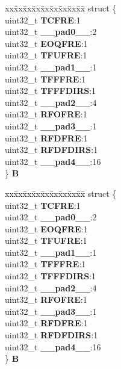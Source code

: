 \begin{DoxyCompactItemize}
\begin{tabbing}
\end{tabbing}\item 
\mbox{\label{unionDSPI__tag_1_1DSPI__RSER__tag_a68bef44c9cbcb72ae3aa250eafebe0d1}} 
\begin{tabbing}
xx\=xx\=xx\=xx\=xx\=xx\=xx\=xx\=xx\=\kill
struct \{\\
\>uint32\_t {\bfseries TCFRE}:1\\
\>uint32\_t {\bfseries \_\_pad0\_\_}:2\\
\>uint32\_t {\bfseries EOQFRE}:1\\
\>uint32\_t {\bfseries TFUFRE}:1\\
\>uint32\_t {\bfseries \_\_pad1\_\_}:1\\
\>uint32\_t {\bfseries TFFFRE}:1\\
\>uint32\_t {\bfseries TFFFDIRS}:1\\
\>uint32\_t {\bfseries \_\_pad2\_\_}:4\\
\>uint32\_t {\bfseries RFOFRE}:1\\
\>uint32\_t {\bfseries \_\_pad3\_\_}:1\\
\>uint32\_t {\bfseries RFDFRE}:1\\
\>uint32\_t {\bfseries RFDFDIRS}:1\\
\>uint32\_t {\bfseries \_\_pad4\_\_}:16\\
\} {\bfseries B}\\

\end{tabbing}\item 
\mbox{\label{unionDSPI__tag_1_1DSPI__RSER__tag_a08b61fc88b6f564316458d92ded2416f}} 
\begin{tabbing}
xx\=xx\=xx\=xx\=xx\=xx\=xx\=xx\=xx\=\kill
struct \{\\
\>uint32\_t {\bfseries TCFRE}:1\\
\>uint32\_t {\bfseries \_\_pad0\_\_}:2\\
\>uint32\_t {\bfseries EOQFRE}:1\\
\>uint32\_t {\bfseries TFUFRE}:1\\
\>uint32\_t {\bfseries \_\_pad1\_\_}:1\\
\>uint32\_t {\bfseries TFFFRE}:1\\
\>uint32\_t {\bfseries TFFFDIRS}:1\\
\>uint32\_t {\bfseries \_\_pad2\_\_}:4\\
\>uint32\_t {\bfseries RFOFRE}:1\\
\>uint32\_t {\bfseries \_\_pad3\_\_}:1\\
\>uint32\_t {\bfseries RFDFRE}:1\\
\>uint32\_t {\bfseries RFDFDIRS}:1\\
\>uint32\_t {\bfseries \_\_pad4\_\_}:16\\
\} {\bfseries B}\\


\end{tabbing}
\end{DoxyCompactItemize}
